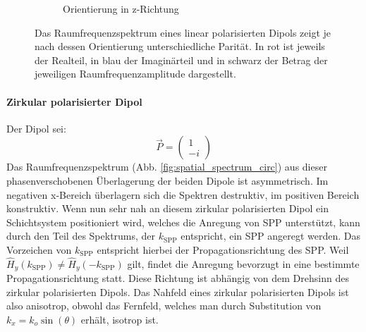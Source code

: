 \documentclass[a4paper, titlepage,  ngerman]{book}
\begin{document}
\begin{figure}
\begin{subfigure}{0.5\textwidth}
			\caption{Orientierung in z-Richtung}
			\label{fig:spatial_spectrum_z}
		\end{subfigure}		
		\caption[Raumfrequenzspektrum linear polarisierter Dipol]{Das Raumfrequenzspektrum eines linear polarisierten Dipols zeigt je nach  dessen Orientierung unterschiedliche Parität. In rot ist jeweils der Realteil, in blau der Imaginärteil und in schwarz der Betrag der jeweiligen Raumfrequenzamplitude dargestellt.}		
	\end{figure}
	\paragraph{Zirkular polarisierter Dipol}
	Der Dipol sei:
	$$\vec{P} = \begin{pmatrix} 1 \\ -i\end{pmatrix}$$
	Das Raumfrequenzspektrum (Abb. \ref{fig:spatial_spectrum_circ}) aus dieser phasenverschobenen Überlagerung der beiden Dipole ist asymmetrisch.  Im negativen x-Bereich überlagern sich die Spektren destruktiv, im positiven Bereich konstruktiv. Wenn nun sehr nah an diesem zirkular polarisierten Dipol ein Schichtsystem positioniert wird, welches die Anregung von SPP unterstützt, kann durch den Teil des Spektrums, der $k_{\mathrm{SPP}}$ entspricht, ein SPP angeregt werden. Das Vorzeichen von $k_{\mathrm{SPP}}$ entspricht hierbei der Propagationsrichtung des SPP. Weil $\hat{H}_y(k_{\mathrm{SPP}}) \neq \hat{H}_y( -k_{\mathrm{SPP}}) $ gilt, findet die Anregung bevorzugt in eine bestimmte Propagationsrichtung statt. Diese Richtung ist abhängig von dem Drehsinn des zirkular polarisierten Dipols.			
	Das Nahfeld eines zirkular polarisierten Dipols ist also anisotrop, obwohl das Fernfeld, welches man durch Substitution von $k_x = k_o \sin(\theta)$ erhält, isotrop ist.
	
\end{document}
